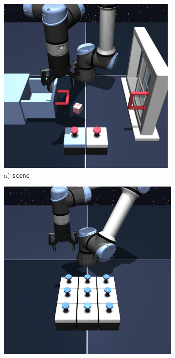 \begin{figure}[t]
    \centering
    \begin{minipage}{0.24\textwidth}
        \begin{subfigure}{\textwidth}
            \centering
            \includegraphics[width=0.98\textwidth]{figures/renders/scene-play-singletask-task2-v0.jpeg}
            \caption{\footnotesize a) \texttt{scene}}
            \label{fig:scene-viz}
        \end{subfigure}
    \end{minipage}\hfill
    \begin{minipage}{0.24\textwidth}
        \begin{subfigure}{\textwidth}
            \centering
            \includegraphics[width=0.98\linewidth]{figures/renders/puzzle-3x3-play-singletask-task2-v0.jpeg}

\end{subfigure}
\end{minipage}
\end{figure}
